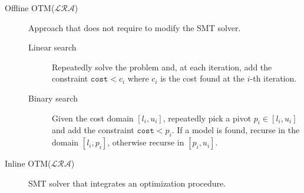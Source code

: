 \begin{description}
    \item[Offline OTM($\mathcal{LRA}$)]
        Approach that does not require to modify the SMT solver.

        \begin{description}
            \item[Linear search]
                Repeatedly solve the problem and, at each iteration, add the constraint $\texttt{cost} < c_i$ where $c_i$ is the cost found at the $i$-th iteration.

            \item[Binary search] 
                Given the cost domain $[l_i, u_i]$,
                repeatedly pick a pivot $p_i \in [l_i, u_i]$ and add the constraint $\texttt{cost} < p_i$.
                If a model is found, recurse in the domain $[l_i, p_i]$, otherwise recurse in $[p_i, u_i]$.
        \end{description}

    \item[Inline OTM($\mathcal{LRA}$)]
        SMT solver that integrates an optimization procedure.
\end{description}